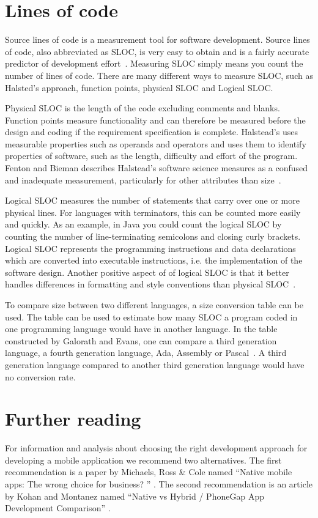 \section{Lines of code}\label{sec:lines-of-code}
Source lines of code is a measurement tool for software development. Source lines of code, also abbreviated as SLOC, is very easy to obtain and is a fairly accurate predictor of development effort~\cite[p.~63]{galorath2006}. Measuring SLOC simply means you count the number of lines of code. There are many different ways to measure SLOC, such as Halsted’s approach, function points, physical SLOC and Logical SLOC. 

Physical SLOC is the length of the code excluding comments and blanks. Function points measure functionality and can therefore be measured before the design and coding if the requirement specification is complete\cite[p.~187]{galorath2006}. Halstead’s uses measurable properties such as operands and operators and uses them to identify properties of software, such as the length, difficulty and effort of the program. Fenton and Bieman describes Halstead’s software science measures as a confused and inadequate measurement, particularly for other attributes than size~\cite[p.~345]{fenton2015}.

Logical SLOC measures the number of statements that carry over one or more physical lines.  For languages with terminators, this can be counted more easily and quickly. As an example, in Java you could count the logical SLOC by counting the number of line-terminating semicolons and closing curly brackets. Logical SLOC represents the programming instructions and data declarations which are converted into executable instructions, i.e. the implementation of the software design. Another positive aspect of of logical SLOC is that it better handles differences in formatting and style conventions than physical SLOC~\cite[p.~155]{galorath2006}.

To compare size between two different languages, a size conversion table can be used. The table can be used to estimate how many SLOC a program coded in one programming language would have in another language. In the table constructed by Galorath and Evans, one can compare a third generation language, a fourth generation language, Ada, Assembly or Pascal~\cite[p.~163]{galorath2006}. A third generation language compared to another third generation language would have no conversion rate. 

\section{Further reading}\label{sec:further-reading}
For information and analysis about choosing the right development approach for developing a mobile application we recommend two alternatives. The first recommendation is a paper by Michaels, Ross \& Cole named “Native mobile apps: The wrong choice for business? ” \cite{michaels2013}. The second recommendation is an article by Kohan and Montanez named “Native vs Hybrid / PhoneGap App Development Comparison” \cite{kohan2015}. 

